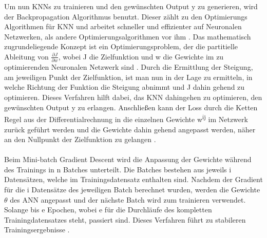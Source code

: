 \documentclass{llncs}
\begin{document}
Um nun KNNs zu trainieren und den gewünschten Output y zu generieren, wird der Backpropagation Algorithmus benutzt. Dieser zählt zu den Optimierungs Algorithmen für KNN und arbeitet schneller und effizienter auf Neuronalen Netzwerken, als andere Optimierungsalgorithmen vor ihm \cite{backprob}. Das mathematisch zugrundeliegende Konzept ist ein Optimierungsproblem, der die partitielle Ableitung von  $\frac{\partial J}{\partial w}$, wobei J die Zielfunktion und w die Gewichte im zu optimierenden Neuronalen Netzwerk sind \cite{Grundlagen}. Durch die Ermittlung der Steigung, am jeweiligen Punkt der Zielfunktion, ist man nun in der Lage zu ermitteln, in welche Richtung der Funktion die Steigung abnimmt und J dahin gehend zu optimieren. Dieses Verfahren hilft dabei, das KNN  dahingehen zu optimieren, den gewünschten Output y zu erlangen.  Anschließen kann der Loss durch die Ketten Regel aus der Differentialrechnung in die einzelnen Gewichte w\textsuperscript{ij} im Netzwerk zurück geführt werden und die Gewichte dahin gehend angepasst werden, näher an den Nullpunkt der Zielfunktion zu gelangen \cite{Grundlagen}.
\\\\
Beim Mini-batch Gradient Descent wird die Anpassung der Gewichte während des Trainings in n Batches unterteilt. Die Batches bestehen aus jeweils i Datensätzen, welche im  Trainingsdatensatz enthalten sind. Nachdem der Gradient für die i Datensätze des jeweiligen Batch berechnet wurden, werden die Gewichte $\theta$ des ANN angepasst und der nächste Batch wird zum trainieren verwendet. Solange bis e Epochen, wobei e für die Durchläufe des kompletten Trainingdatensatzes steht, passiert sind. Dieses Verfahren führt zu stabileren Trainingsergebnisse \cite{batchgradeint}.
\end{document}

